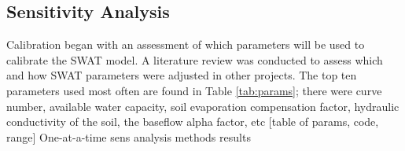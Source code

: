 \subsection{Sensitivity Analysis}
	Calibration began with an assessment of which parameters will be used to calibrate the SWAT model. A literature review was conducted to assess which and how SWAT parameters were adjusted in other projects. The top ten parameters used most often are found in Table \ref{tab:params}; there were curve number, available water capacity, soil evaporation compensation factor, hydraulic conductivity of the soil, the baseflow alpha factor, etc
	[table of params, code, range]
	One-at-a-time sens analysis
		methods
		results
		

\pagebreak